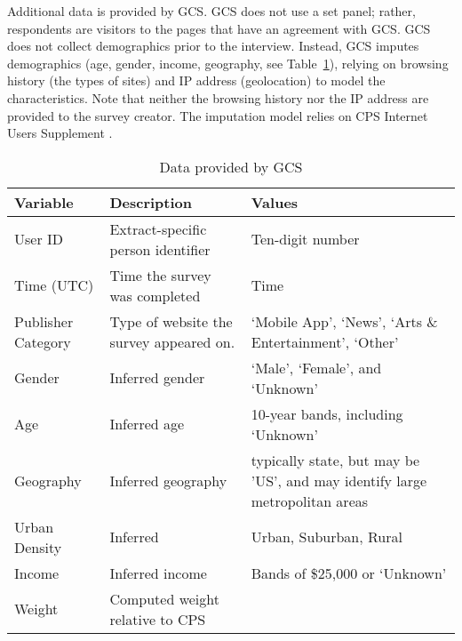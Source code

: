 Additional data is provided by \ac{GCS}. \ac{GCS} does not use a set panel; rather, respondents are visitors to the pages that have an agreement with \ac{GCS}. \ac{GCS} does not collect demographics prior to the interview. Instead, \ac{GCS} imputes demographics  (age, gender, income, geography, see Table~\ref{tab:data}), relying on browsing history (the types of sites) and IP address (geolocation) to model the characteristics. Note that neither the browsing history nor the IP address are provided to the survey creator. The imputation model relies on CPS Internet Users Supplement \citep{varianGoogle2015}.

\begin{table}
	\caption{\label{tab:data}Data provided by GCS}
\begin{tabular}{p{1in}p{2in}p{2.5in}}
\bfseries Variable & \bfseries Description & \bfseries Values\\
\hline
User ID	& Extract-specific person identifier & Ten-digit number \\
Time (UTC) & Time the survey was completed& Time\\
Publisher Category& Type of website the survey appeared on. & `Mobile App', `News', `Arts \& Entertainment', `Other'\\
Gender & Inferred gender &`Male', `Female', and `Unknown'\\
Age	& Inferred age & 10-year bands, including `Unknown'\\
Geography	& Inferred geography & typically state, but may be 'US', and may identify large metropolitan areas\\
Urban Density& Inferred & Urban, Suburban, Rural\\
Income & Inferred income & Bands of \$25,000 or `Unknown'\\
Weight & Computed weight relative to CPS& \\
\hline
\end{tabular}
\end{table}
